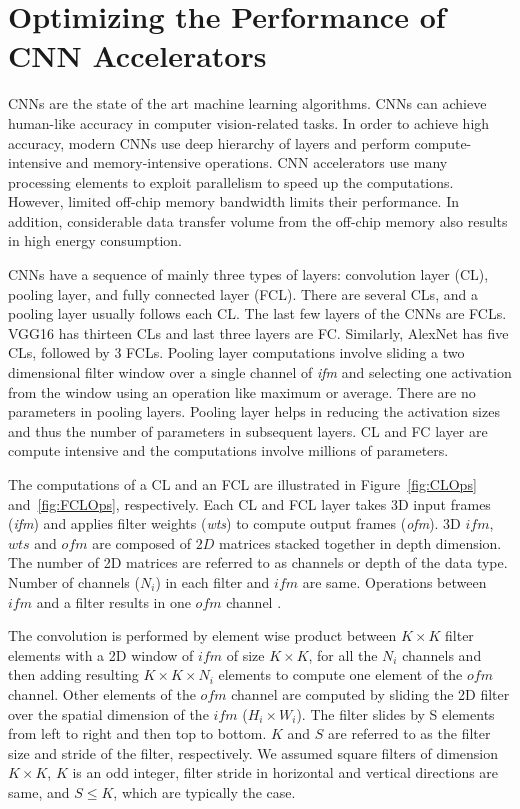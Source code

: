 \graphicspath{{./Ch3-CNN/images/}}

\chapter{Optimizing the Performance of CNN Accelerators} \label{chap:CNN}
CNNs are the state of the art machine learning algorithms. CNNs can achieve human-like accuracy in computer vision-related tasks. In order to achieve high accuracy, modern CNNs use deep hierarchy of layers and perform compute-intensive and memory-intensive operations. CNN accelerators use many processing elements to exploit parallelism to speed up the computations. However, limited off-chip memory bandwidth limits their performance. In addition, considerable data transfer volume from the off-chip memory also results in high energy consumption.

CNNs have a sequence of mainly three types of layers: convolution layer (CL), pooling layer, and fully connected layer (FCL). There are several CLs, and a pooling layer usually follows each CL. The last few layers of the CNNs are FCLs. VGG16 has thirteen CLs and last three layers are FC. Similarly, AlexNet has five CLs, followed by 3 FCLs. Pooling layer computations involve sliding a two dimensional filter window over a single channel of \textit{ifm} and selecting one activation from the window using an operation like maximum or average. There are no parameters in pooling layers. Pooling layer helps in reducing the activation sizes and thus the number of parameters in subsequent layers. CL and FC layer are compute intensive and the computations involve millions of parameters. 

The computations of a CL and an FCL are illustrated in Figure~\ref{fig:CLOps} and~\ref{fig:FCLOps}, respectively. Each CL and FCL layer takes 3D input frames (\textit{ifm}) and applies filter weights (\textit{wts}) to compute output frames (\textit{ofm}). 3D $ifm$, $wts$ and $ofm$ are composed of $2D$ matrices stacked together in depth dimension. The number of 2D matrices are referred to as channels or depth of the data type. Number of channels ($N_i$) in each filter and $ifm$ are same.  Operations between $ifm$ and a filter results in one $ofm$ channel .  

The convolution is performed by element wise product between $K{\times}K$ filter elements with a 2D window of $ifm$ of size $K{\times}K$, for all the $N_i$ channels and then adding resulting $K{\times}K{\times}N_i$ elements to compute one element of the $ofm$ channel. Other elements of the $ofm$ channel are computed by sliding the 2D filter over the spatial dimension of the $ifm$ ($H_i{\times}W_i$). The filter slides by S elements from left to right and then top to bottom. $K$ and $S$ are referred to as the filter size and stride of the filter, respectively. We assumed square filters of dimension $K{\times}K$, $K$ is an odd integer, filter stride in horizontal and vertical directions are same, and $S{\le}K$, which are typically the case. 

